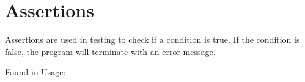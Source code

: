 \section{Assertions}
    Assertions are used in testing to check if a condition is true. If the condition is false, the program will terminate with an error message.
    
    Found in  \qquad Usage: 
